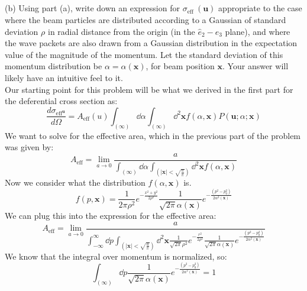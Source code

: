 \documentclass[12pt]{article}
\begin{document}
\subsection{}

(b) Using part (a), write down an expression for $\sigma_{\text {eff }}(\mathbf{u})$ appropriate to the case where the beam particles are distributed according to a Gaussian of standard deviation $\rho$ in radial distance from the origin (in the $\hat{e}_{2}-\hat{e}_{3}$ plane), and where the wave packets are also drawn from a Gaussian distribution in the expectation value of the magnitude of the momentum. Let the standard deviation of this momentum distribution be $\alpha=\alpha(\mathbf{x})$, for beam position $\mathbf{x}$. Your answer will likely have an intuitive feel to it.\\
Our starting point for this problem will be what we derived in the first part for the deferential cross section as:
\begin{equation}
\frac{d\sigma_{\text{eff}^{\textbf{u}}}}{d\Omega} = A_{\text{eff}}(u) \int_{(\infty)} \dd{\alpha} \int_{(\infty)} \dd^2{\textbf{x}} f(\alpha, \textbf{x}) P(\textbf{u} ; \alpha ; \mathbf{x})
\end{equation}
We want to solve for the effective area, which in the previous part of the problem was given by:
\begin{equation}
A_{\text{eff}} = \lim_{a \to 0} \frac{a}{\int_{(\infty)} \dd{\alpha} \int_{(|\textbf{x}| < \sqrt{\frac{a}{\pi}})} \dd^2{\textbf{x}} f(\alpha, \textbf{x})}
\end{equation}
Now we consider what the distribution $f(\alpha, \textbf{x})$ is.
\begin{equation}
f(p, \textbf{x}) = \frac{1}{{2\pi \rho^2}} e^{-\frac{x^2 + y^2}{2\rho^2}} \frac{1}{\sqrt{2\pi } \alpha(\textbf{x})} e^{-\frac{(p^2 - p_0^2)}{2\alpha^2(\textbf{x})}}
\end{equation}
We can plug this into the expression for the effective area:
\begin{equation}
A_{\text{eff}} = \lim_{a \to 0} \frac{a}{\int_{-\infty}^{\infty} \dd{p} \int_{(|\textbf{x}| < \sqrt{\frac{a}{\pi}})} \dd^2{\textbf{x}} \frac{1}{{\sqrt{2\pi }\rho^2}} e^{-\frac{r^2}{2\rho^2}} \frac{1}{\sqrt{2\pi } \alpha(\textbf{x})} e^{-\frac{(p^2 - p_0^2)}{2\alpha^2(\textbf{x})}}}
\end{equation}
We know that the integral over momentum is normalized, so:
\begin{equation}
  \int_{(\infty)} \dd{p} \frac{1}{\sqrt{2\pi } \alpha(\textbf{x})} e^{-\frac{(p^2 - p_0^2)}{2\alpha^2(\textbf{x})}} = 1
\end{equation}
\end{document}
